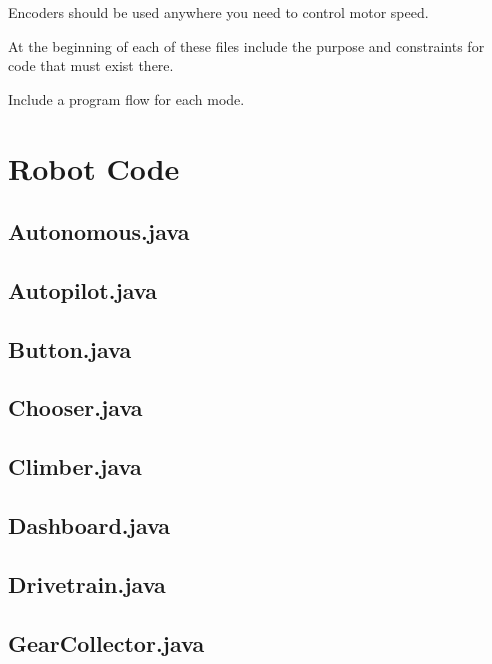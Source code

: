 \documentclass[letterpaper,10pt]{memoir}
\newcommand{\filelister}[1]{%
		
	}
\begin{document}
Encoders should be used anywhere you need to control motor speed.




At the beginning of each of these files include the purpose and constraints for code that must exist there.

Include a program flow for each mode.





\newpage\chapter{Robot Code}

\newpage\section*{Autonomous.java}
\filelister{Autonomous.java}

\newpage\section*{Autopilot.java}
\filelister{Autopilot.java}

\newpage\section*{Button.java}
\filelister{Button.java}

\newpage\section*{Chooser.java}
\filelister{Chooser.java}

\newpage\section*{Climber.java}
\filelister{Climber.java}

\newpage\section*{Dashboard.java}
\filelister{Dashboard.java}

\newpage\section*{Drivetrain.java}
\filelister{Drivetrain.java}

\newpage\section*{GearCollector.java}
\filelister{GearCollector.java}
\end{document}
